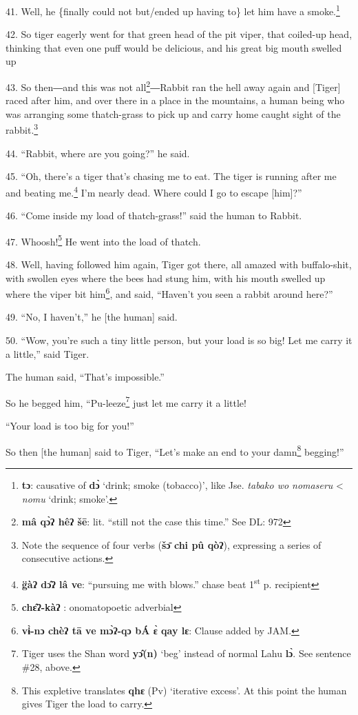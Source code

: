41. Well, he \{finally could not but/ended up having to\} let him have a smoke.\footnote{\textbf{ tɔ}: causative of \textbf{dɔ̀ }`drink; smoke (tobacco)', like Jse. \textit{tabako wo nomaseru }< \textit{nomu} `drink; smoke'.}

42. So tiger eagerly went for that green head of the pit viper, that coiled-up
head, thinking that even one puff would be delicious, and his great big mouth swelled
up

43. So then―and this was not all\footnote{\textbf{mâ qɔ̀ʔ hêʔ šē}: lit. ``still not the case this time.'' See DL: 972}―Rabbit ran the hell away again and [Tiger]
raced after him, and over there in a place in the mountains, a human being who
was arranging some thatch-grass to pick up and carry home caught sight of the rabbit.\footnote{Note the sequence of four verbs (\textbf{šɔ̄ chi pû qòʔ}), expressing a series of consecutive actions.}

44. ``Rabbit, where are you going?'' he said.

45. ``Oh, there's a tiger that's chasing me to eat. The tiger is running after
me and beating me.\footnote{\textbf{ g̈àʔ  dɔ̂ʔ  lâ    ve}: ``pursuing me with blows.'' chase beat 1\textsuperscript{st} p. recipient} I'm nearly dead. Where could I go to escape [him]?''

46. ``Come inside my load of thatch-grass!'' said the human to Rabbit.

47. Whoosh!\footnote{\textbf{chɛ̂ʔ-kàʔ} : onomatopoetic adverbial} He went into the load of thatch.

48. Well, having followed him again, Tiger got there, all amazed with buffalo-shit,
with swollen eyes where the bees had stung him, with his mouth swelled up where
the viper bit him\footnote{\textbf{ vɨ̀-nɔ chèʔ tā ve mɔ̀ʔ-qɔ bÁ ɛ̀ qay lɛ}: Clause added by JAM.}, and said, ``Haven't you seen a rabbit around here?''

49. ``No, I haven't,'' he [the human] said.

50. ``Wow, you're such a tiny little person, but your load is so big! Let me carry
it a little,'' said Tiger.

The human said, ``That's impossible.''

So he begged him, ``Pu-leeze\footnote{Tiger uses the Shan word \textbf{yɔ̂(n)} `beg' instead of normal Lahu \textbf{lɔ̀}. See sentence \#28, above.} just let me carry it a little!

``Your load is too big for you!''

So then [the human] said to Tiger, ``Let's make an end to your damn\footnote{This expletive translates \textbf{qhɛ} (Pv) `iterative excess'. At this point the human gives Tiger the load to carry.} begging!''

